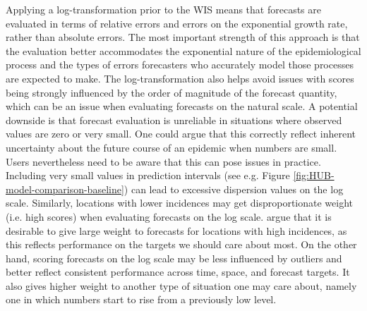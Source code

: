 \documentclass{article}
\begin{document}
Applying a log-transformation prior to the WIS means that forecasts are evaluated in terms of relative errors and errors on the exponential growth rate, rather than absolute errors. The most important strength of this approach is that the evaluation better accommodates the exponential nature of the epidemiological process and the types of errors forecasters who accurately model those processes are expected to make. The log-transformation also helps avoid issues with scores being strongly influenced by the order of magnitude of the forecast quantity, which can be an issue when evaluating forecasts on the natural scale. 
A potential downside is that forecast evaluation is unreliable in situations where observed values are zero or very small. One could argue that this correctly reflect inherent uncertainty about the future course of an epidemic when numbers are small. Users nevertheless need to be aware that this can pose issues in practice. Including very small values in prediction intervals (see e.g. Figure \ref{fig:HUB-model-comparison-baseline}) can lead to excessive dispersion values on the log scale. 
Similarly, locations with lower incidences may get disproportionate weight (i.e. high scores) when evaluating forecasts on the log scale. \cite{bracherEvaluatingEpidemicForecasts2021} argue that it is desirable to give large weight to forecasts for locations with high incidences, as this reflects performance on the targets we should care about most. On the other hand, scoring forecasts on the log scale may be less influenced by outliers and better reflect consistent performance across time, space, and forecast targets. It also gives higher weight to another type of situation one may care about, namely one in which numbers start to rise from a previously low level.
\end{document}
